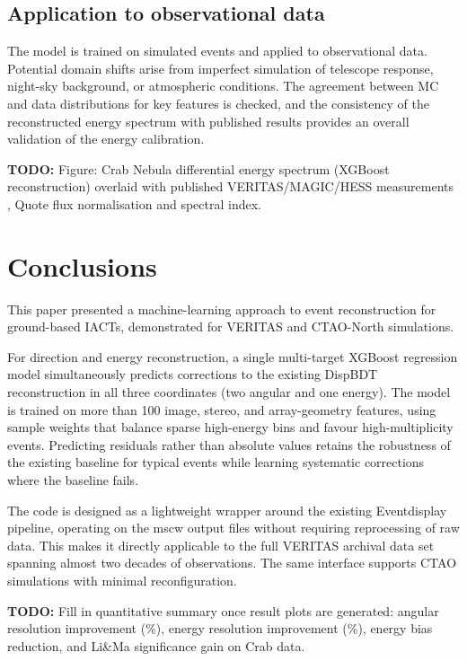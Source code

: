 \documentclass[12pt]{article}
\newcommand{\todo}[1]{\begin{hintBox} \textbf{TODO:} #1 \end{hintBox}}
\begin{document}
\subsection{Application to observational data}

The model is trained on simulated events and applied to observational data.
Potential domain shifts arise from imperfect simulation of telescope response,
night-sky background, or atmospheric conditions.
The agreement between MC and data distributions for key features is checked,
and the consistency of the reconstructed energy spectrum with published results
provides an overall validation of the energy calibration.
\todo{Figure: Crab Nebula differential energy spectrum (XGBoost reconstruction)
overlaid with published VERITAS/MAGIC/HESS measurements \citep{2015ICRC...34..792M},
Quote flux normalisation and spectral index.}



\section{Conclusions}
\label{sec:conclusions}

This paper presented a machine-learning approach to event reconstruction for ground-based IACTs, demonstrated for VERITAS and
CTAO-North simulations.

For direction and energy reconstruction, a single multi-target XGBoost regression model
simultaneously predicts corrections to the existing DispBDT reconstruction
in all three coordinates (two angular and one energy).
The model is trained on more than 100 image, stereo, and array-geometry features,
using sample weights that balance sparse high-energy bins and favour high-multiplicity events.
Predicting residuals rather than absolute values retains the robustness of the
existing baseline for typical events while learning systematic corrections where the
baseline fails.

The code is designed as a lightweight wrapper around the existing Eventdisplay
pipeline, operating on the mscw output files without requiring reprocessing
of raw data.
This makes it directly applicable to the full VERITAS archival data set
spanning almost two decades of observations.
The same interface supports CTAO simulations with minimal reconfiguration.

\todo{Fill in quantitative summary once result plots are generated: angular resolution improvement (\%), energy resolution improvement (\%), energy bias reduction, and Li\&Ma significance gain on Crab data.}
\end{document}
